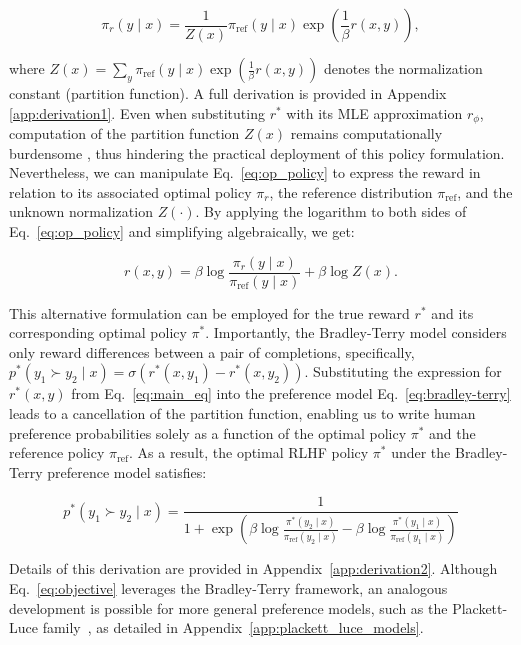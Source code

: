 \begin{equation}\label{eq:op_policy}
    \pi_r(y\mid x) = \frac{1}{Z(x)}\pi_\text{ref}(y\mid x)\exp\left(\frac{1}{\beta}r(x, y)\right),
\end{equation}

where $Z(x) =\sum_{y}\pi_\text{ref}(y\mid x)\exp\left(\frac{1}{\beta}r(x, y)\right)$ denotes the normalization constant (partition function). A full derivation is provided in Appendix \ref{app:derivation1}. Even when substituting $r^*$ with its MLE approximation $r_\phi$, computation of the partition function $Z(x)$ remains computationally burdensome \citep{korbak2022reinforcement, go2023aligning}, thus hindering the practical deployment of this policy formulation. Nevertheless, we can manipulate Eq.~\ref{eq:op_policy} to express the reward in relation to its associated optimal policy $\pi_r$, the reference distribution $\pi_\text{ref}$, and the unknown normalization $Z(\cdot)$. By applying the logarithm to both sides of Eq.~\ref{eq:op_policy} and simplifying algebraically, we get:

\begin{equation}\label{eq:main_eq}
    r(x,y) =\beta \log \frac{\pi_r(y\mid x)}{\pi_\text{ref}(y\mid x)} + \beta \log Z(x).
\end{equation}

This alternative formulation can be employed for the true reward $r^*$ and its corresponding optimal policy $\pi^*$. Importantly, the Bradley-Terry model considers only reward differences between a pair of completions, specifically, ${p^*(y_1 \succ y_2 \mid x) = \sigma(r^*(x, y_1) - r^*(x, y_2))}$. Substituting the expression for $r^*(x,y)$ from Eq.~\ref{eq:main_eq} into the preference model Eq.~\ref{eq:bradley-terry} leads to a cancellation of the partition function, enabling us to write human preference probabilities solely as a function of the optimal policy $\pi^*$ and the reference policy $\pi_\text{ref}$. As a result, the optimal RLHF policy $\pi^*$ under the Bradley-Terry preference model satisfies:

\begin{equation}\label{eq:objective}
    p^*(y_1\succ y_2 \mid x)=\frac{1}{1 + \exp\left(\beta \log \frac{\pi^*(y_2\mid x)}{\pi_\text{ref}(y_2\mid x)} - \beta \log \frac{\pi^*(y_1\mid x)}{\pi_\text{ref}(y_1\mid x)}\right)}
\end{equation}

Details of this derivation are provided in Appendix~\ref{app:derivation2}. Although Eq.~\ref{eq:objective} leverages the Bradley-Terry framework, an analogous development is possible for more general preference models, such as the Plackett-Luce family~\citep{plackett1975analysis, luce2012individual}, as detailed in Appendix~\ref{app:plackett_luce_models}.

